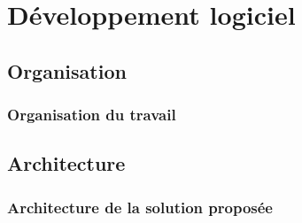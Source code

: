 \section{D\'eveloppement logiciel}

\subsection{Organisation}
\frame
{
\frametitle{Organisation du travail}


}

\subsection{Architecture}
\frame
{
\frametitle{Architecture de la solution propos\'ee}


\begin{minipage}{0.45\textwidth}
\begin{flushleft}
\begin{center}

\end{center}
\end{flushleft}
\end{minipage}}
